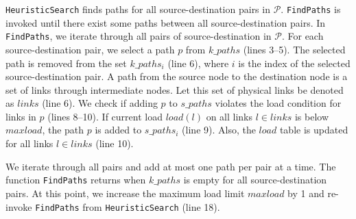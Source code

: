 \texttt{HeuristicSearch} finds paths for all source-destination pairs in $\mathcal{P}$. \texttt{FindPaths} is invoked until there exist some paths between all source-destination pairs. In \texttt{FindPaths}, we iterate through all pairs of source-destination in $\mathcal{P}$. For each source-destination pair, we select a path $p$ from $k\_paths$ (lines 3--5). The selected path is removed from the set $k\_paths_i$ (line 6), where $i$ is the index of the selected source-destination pair. A path from the source node to the destination node is a set of links through intermediate nodes. Let this set of physical links be denoted as $links$ (line 6). We check if adding $p$ to $s\_paths$ violates the load condition for links in $p$ (lines 8--10). If current load $load(l)$ on all links $l \in links$ is below $maxload$, the path $p$ is added to $s\_paths_i$ (line 9). Also, the $load$ table is updated for all links $l \in links$ (line 10). 

We iterate through all pairs and add at most one path per pair at a time. The function \texttt{FindPaths} returns when $k\_paths$ is empty for all source-destination pairs. At this point, we increase the maximum load limit $maxload$ by 1 and re-invoke \texttt{FindPaths} from \texttt{HeuristicSearch} (line 18). 


